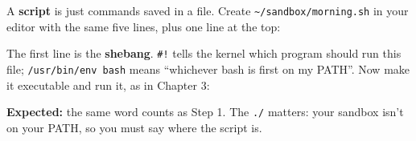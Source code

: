 A \textbf{script} is just commands saved in a file. Create \texttt{\textasciitilde{}/}\allowbreak{}\texttt{sandbox/}\allowbreak{}\texttt{morning.sh} in your editor with the same five lines, plus one line at the top:

\begin{codeblock}

\begin{Shaded}
\begin{Highlighting}[]
 \VariableTok{$(}\VariableTok{)} \OperatorTok{\textgreater{}} \VariableTok{$(}\VariableTok{)}
 \VariableTok{$(}\VariableTok{)}
  
  \PreprocessorTok{*}
\end{Highlighting}
\end{Shaded}

\end{codeblock}

The first line is the \textbf{shebang}. \texttt{\#!} tells the kernel which program should run this file; \texttt{/usr/bin/env\ bash} means ``whichever bash is first on my PATH''. Now make it executable and run it, as in Chapter 3:

\begin{codeblock}

\begin{Shaded}
\begin{Highlighting}[]
\end{Highlighting}
\end{Shaded}

\end{codeblock}

\textbf{Expected:} the same word counts as Step 1. The \texttt{./} matters: your sandbox isn't on your PATH, so you must say where the script is.

